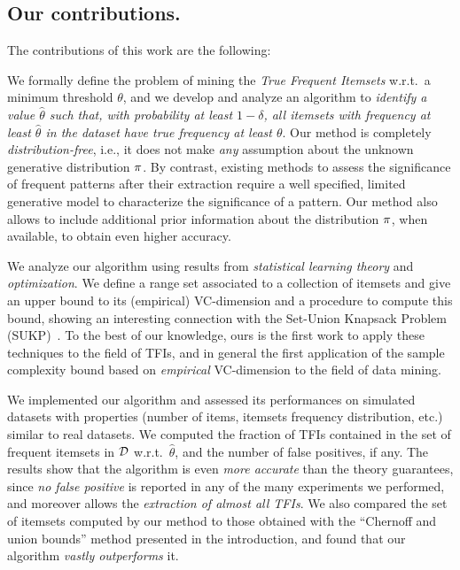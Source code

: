 \subsection{Our contributions.}
The contributions of this work are the following:
\begin{itemize*}
	\item We formally define the problem of mining the \emph{True Frequent
	Itemsets} w.r.t.~a minimum threshold $\theta$, and we develop and analyze an
	algorithm to \emph{identify a value $\hat{\theta}$ such that, with
	probability at least $1-\delta$, all itemsets with frequency at least
	$\hat{\theta}$ in the dataset have true frequency at least $\theta$}. Our
	method is completely \emph{distribution-free}, i.e., it does not make
	\emph{any} assumption about the unknown generative distribution $\pi$. By
	contrast, existing methods to assess the significance of frequent patterns
	after their extraction require a well specified, limited generative model to
	characterize the significance of a pattern. Our method also allows to
	include additional prior information about the distribution $\pi$, when
	available, to obtain even higher accuracy.
	\item We analyze our algorithm using results from \emph{statistical learning
	theory} and \emph{optimization}. We define a range set associated to a
	collection of itemsets and give an upper bound to its (empirical)
	VC-dimension and a procedure to compute this bound, showing an interesting
	connection with the Set-Union Knapsack Problem
	(SUKP)~\citep{GoldschmidtNY94}. To the best of our knowledge, ours is the
	first work to apply these techniques to the field of TFIs, and in general
	the first application of the sample complexity bound based on
	\emph{empirical} VC-dimension to the field of data mining.
	\item We implemented our algorithm and assessed its performances on
	simulated datasets with properties (number of items, itemsets frequency
	distribution, etc.) similar to real datasets. We computed the fraction of
	TFIs contained in the set of frequent itemsets in ${\cal D}$ w.r.t.~$\hat\theta$,
	and the number of false positives, if any. The results show that the
	algorithm is even \emph{more accurate} than the theory guarantees, since
	\emph{no false positive} is reported in any of the many experiments we
	performed, and moreover allows the \emph{extraction of almost all TFIs}. We
	also compared the set of itemsets computed by our method to those obtained
	with the ``Chernoff and union bounds'' method presented in the introduction,
	and found that our algorithm \emph{vastly outperforms} it.
\end{itemize*}

